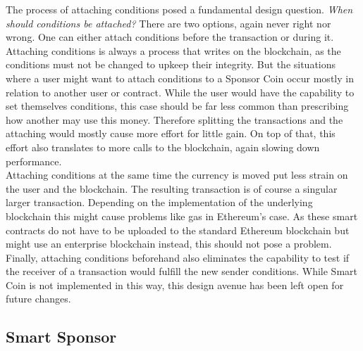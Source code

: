 The process of attaching conditions posed a fundamental design question. \emph{When should conditions be attached?} There are two options, again never right nor wrong. One can either attach conditions before the transaction or during it. Attaching conditions is always a process that writes on the blockchain, as the conditions must not be changed to upkeep their integrity. But the situations where a user might want to attach conditions to a Sponsor Coin occur mostly in relation to another user or contract. While the user would have the capability to set themselves conditions, this case should be far less common than prescribing how another may use this money. Therefore splitting the transactions and the attaching would mostly cause more effort for little gain. On top of that, this effort also translates to more calls to the blockchain, again slowing down performance.\\
Attaching conditions at the same time the currency is moved put less strain on the user and the blockchain. The resulting transaction is of course a singular larger transaction. Depending on the implementation of the underlying blockchain this might cause problems like gas in Ethereum's case. As these smart contracts do not have to be uploaded to the standard Ethereum blockchain but might use an enterprise blockchain instead, this should not pose a problem.\\
Finally, attaching conditions beforehand also eliminates the capability to test if the receiver of a transaction would fulfill the new sender conditions. While Smart Coin is not implemented in this way, this design avenue has been left open for future changes.
\subsection{Smart Sponsor}